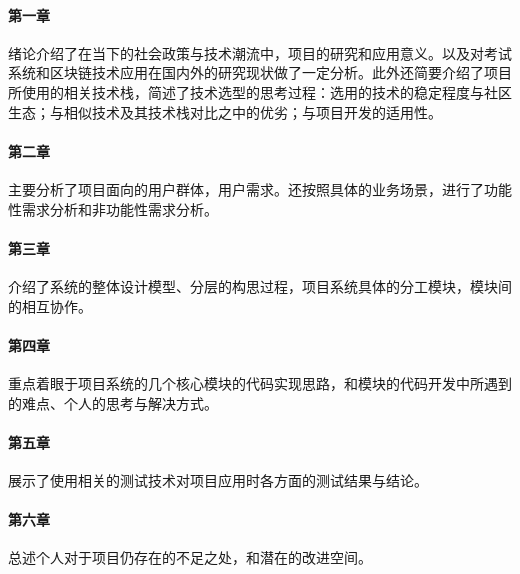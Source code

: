 \paragraph{第一章}绪论介绍了在当下的社会政策与技术潮流中，项目的研究和应用意义。以及对考试系统和区块链技术应用在国内外的研究现状做了一定分析。此外还简要介绍了项目所使用的相关技术栈，简述了技术选型的思考过程：选用的技术的稳定程度与社区生态；与相似技术及其技术栈对比之中的优劣；与项目开发的适用性。

\paragraph{第二章}主要分析了项目面向的用户群体，用户需求。还按照具体的业务场景，进行了功能性需求分析和非功能性需求分析。

\paragraph{第三章}介绍了系统的整体设计模型、分层的构思过程，项目系统具体的分工模块，模块间的相互协作。

\paragraph{第四章}重点着眼于项目系统的几个核心模块的代码实现思路，和模块的代码开发中所遇到的难点、个人的思考与解决方式。

\paragraph{第五章}展示了使用相关的测试技术对项目应用时各方面的测试结果与结论。

\paragraph{第六章}总述个人对于项目仍存在的不足之处，和潜在的改进空间。